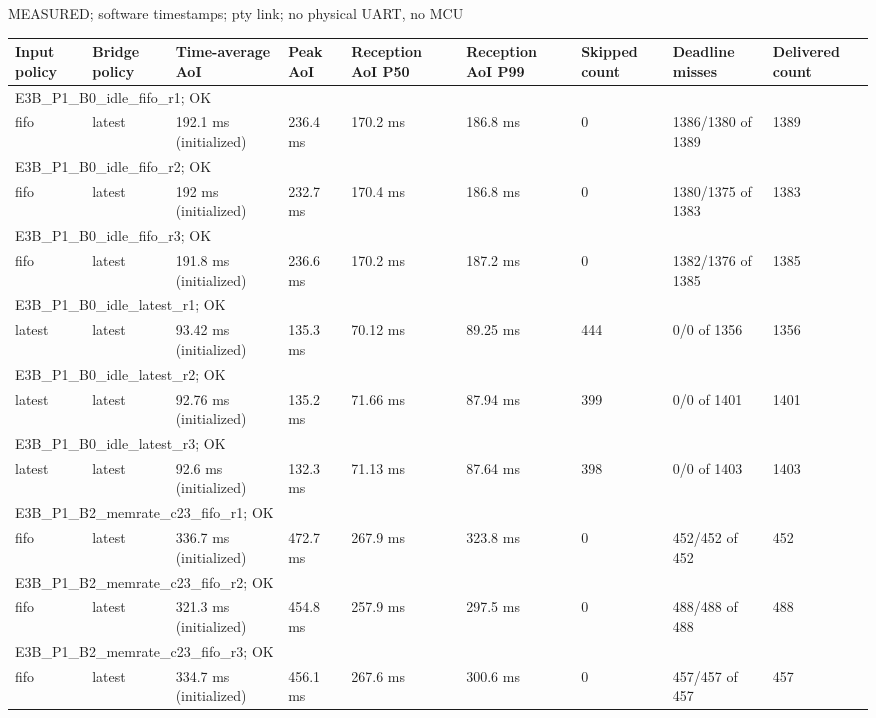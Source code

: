 \par\noindent MEASURED; software timestamps; pty link; no physical UART, no MCU\par
\begin{tabular}{lllllllll}
\toprule
Input policy & Bridge policy & Time-average AoI & Peak AoI & Reception AoI P50 & Reception AoI P99 & Skipped count & Deadline misses & Delivered count \\
\midrule
\multicolumn{9}{l}{E3B\_P1\_B0\_idle\_fifo\_r1; OK} \\
fifo & latest & 192.1 ms (initialized) & 236.4 ms & 170.2 ms & 186.8 ms & 0 & 1386/1380 of 1389 & 1389 \\
\multicolumn{9}{l}{E3B\_P1\_B0\_idle\_fifo\_r2; OK} \\
fifo & latest & 192 ms (initialized) & 232.7 ms & 170.4 ms & 186.8 ms & 0 & 1380/1375 of 1383 & 1383 \\
\multicolumn{9}{l}{E3B\_P1\_B0\_idle\_fifo\_r3; OK} \\
fifo & latest & 191.8 ms (initialized) & 236.6 ms & 170.2 ms & 187.2 ms & 0 & 1382/1376 of 1385 & 1385 \\
\multicolumn{9}{l}{E3B\_P1\_B0\_idle\_latest\_r1; OK} \\
latest & latest & 93.42 ms (initialized) & 135.3 ms & 70.12 ms & 89.25 ms & 444 & 0/0 of 1356 & 1356 \\
\multicolumn{9}{l}{E3B\_P1\_B0\_idle\_latest\_r2; OK} \\
latest & latest & 92.76 ms (initialized) & 135.2 ms & 71.66 ms & 87.94 ms & 399 & 0/0 of 1401 & 1401 \\
\multicolumn{9}{l}{E3B\_P1\_B0\_idle\_latest\_r3; OK} \\
latest & latest & 92.6 ms (initialized) & 132.3 ms & 71.13 ms & 87.64 ms & 398 & 0/0 of 1403 & 1403 \\
\multicolumn{9}{l}{E3B\_P1\_B2\_memrate\_c23\_fifo\_r1; OK} \\
fifo & latest & 336.7 ms (initialized) & 472.7 ms & 267.9 ms & 323.8 ms & 0 & 452/452 of 452 & 452 \\
\multicolumn{9}{l}{E3B\_P1\_B2\_memrate\_c23\_fifo\_r2; OK} \\
fifo & latest & 321.3 ms (initialized) & 454.8 ms & 257.9 ms & 297.5 ms & 0 & 488/488 of 488 & 488 \\
\multicolumn{9}{l}{E3B\_P1\_B2\_memrate\_c23\_fifo\_r3; OK} \\
fifo & latest & 334.7 ms (initialized) & 456.1 ms & 267.6 ms & 300.6 ms & 0 & 457/457 of 457 & 457 \\

\end{tabular}
